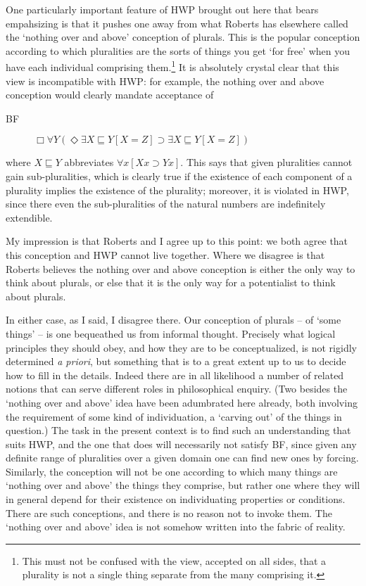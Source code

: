 \documentclass{article}
\begin{document}
One particularly important feature of HWP brought out here that bears empahsizing 
is that it pushes one away from what Roberts has elsewhere called the 
`nothing over and above' conception of plurals. This is the popular conception 
according to which pluralities are the sorts of things you get `for free'
when you have each individual comprising them.\footnote{This must not be confused with 
the view, accepted on all sides, that a plurality is not a single thing 
separate from the many comprising it.} It is absolutely crystal 
clear that this view is incompatible with HWP: for example, 
the nothing over and above conception would clearly mandate acceptance of 
\begin{description}
    \item[BF] $\Box \forall Y (\Diamond \exists X \sqsubseteq Y [X = Z] \supset \exists X \sqsubseteq Y[X = Z])$
\end{description}
where $X \sqsubseteq Y$ abbreviates $\forall x[Xx \supset Yx]$. 
This says that given pluralities cannot gain sub-pluralities, which 
is clearly true if the existence of each component of a plurality 
implies the existence of the plurality; moreover, it is violated 
in HWP, since there even the sub-pluralities of the natural numbers are indefinitely 
extendible.

My impression is that Roberts and I agree up to this point:
we both agree that this conception and HWP cannot live together.
Where we disagree is that Roberts believes the nothing over and above 
conception is either the only way to think about plurals, or else 
that it is the only way for a potentialist to think about plurals.

In either case, as I said, I disagree there.
Our conception of plurals -- of `some things' -- 
is one bequeathed us from informal thought. Precisely what logical principles 
they should obey, and how they are to be conceptualized, is not rigidly 
determined \emph{a priori}, but something that is to a great extent up to 
us to decide how to fill in the details. Indeed there are in all likelihood 
a number of related notions that can serve different roles in philosophical 
enquiry. (Two besides the `nothing over and above' idea have been adumbrated here 
already, both involving the requirement of some kind of individuation, a `carving out' 
of the things in question.) 
The task in the present context is to find such an understanding that suits HWP, 
and the one that does 
will necessarily not satisfy BF, since given any definite range of pluralities 
over a given domain one can find new ones by forcing. Similarly, 
the conception will not be one according to which many things are 
`nothing over and above' the things they comprise, but 
rather one where they will in general
depend for their existence on individuating properties or conditions.
There are such conceptions, and there is no reason not to invoke them. The 
`nothing over and above' idea is not somehow written into the fabric of reality.
\end{document}
